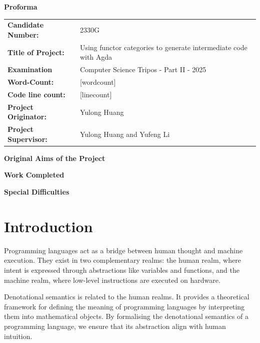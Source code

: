 \documentclass[12pt,twoside,a4paper]{report}
\theoremstyle{definition}
\theoremstyle{definition}
\theoremstyle{definition}
\theoremstyle{definition}
\newcommand{\frontmatter}{
  \pagenumbering{roman}
}
\newcommand{\mainmatter}{
  \cleardoublepage
  \pagenumbering{arabic}
  \setcounter{page}{1}
}
\begin{document}
\begin{titlepage}
    \vspace*{5em}
    \textbf{\LARGE Proforma}
    \vspace{2em}

    \begin{tabular}{ll}
        \textbf{Candidate Number:} & 2330G \\
        \textbf{Title of Project:} & Using functor categories to generate intermediate code with Agda \\
        \textbf{Examination} & Computer Science Tripos - Part II - 2025 \\
        \textbf{Word-Count:} & [wordcount] \\
        \textbf{Code line count:} & [linecount] \\
        \textbf{Project Originator:} & Yulong Huang \\
        \textbf{Project Supervisor:} & Yulong Huang and Yufeng Li \\
    \end{tabular}

    \vspace{2em}
    \textbf{\Large Original Aims of the Project}
    \vspace{1em}

    \vspace{2em}
    \textbf{\Large Work Completed}
    \vspace{1em}

    \vspace{2em}
    \textbf{\Large Special Difficulties}
    \vspace{1em}
\end{titlepage}

\frontmatter
\tableofcontents
\newpage

\mainmatter
\chapter{Introduction}
    \minitoc
    Programming languages act as a bridge between human thought and machine execution. They exist in two complementary realms: the human realm, where intent is expressed through abstractions like variables and functions, and the machine realm, where low-level instructions are executed on hardware. 

    Denotational semantics is related to the human realms. It provides a theoretical framework for defining the meaning of programming languages by interpreting them into mathematical objects. By formalising the denotational semantics of a programming language, we ensure that its abstraction align with human intuition. 
\end{document}
